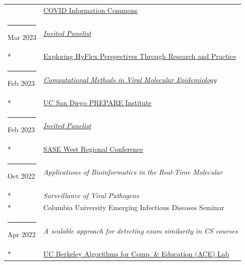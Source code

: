 \documentclass[margin,line]{res}
\begin{document}
\begin{resume}
\begin{longtable}{@{}p{0.7in}p{4in}}
\hspace*{-4mm} & \hspace{4mm} \href{https://covidinfocommons.datascience.columbia.edu/}{COVID Information Commons}\\
\hspace*{-4mm} \rule{-1mm}{5mm} Mar 2023 & \href{https://teaching.ucr.edu/deck/2023/03/09/exploring-hyflex-perspectives-through-research-and-practice-panel-discussion}{\textit{Invited Panelist}}\\*
\hspace*{-4mm} & \hspace{4mm} \href{https://teaching.ucr.edu/deck/2023/03/09/exploring-hyflex-perspectives-through-research-and-practice-panel-discussion}{Exploring HyFlex Perspectives Through Research and Practice}\\
\hspace*{-4mm} \rule{-1mm}{5mm} Feb 2023 & \href{https://youtu.be/IkSkQPXsXds}{\textit{Computational Methods in Viral Molecular Epidemiology}}\\*
\hspace*{-4mm} & \hspace{4mm} \href{https://prepare.ucsd.edu/}{UC San Diego PREPARE Institute}\\
\hspace*{-4mm} \rule{-1mm}{5mm} Feb 2023 & \href{https://www.saseconnect.org/regional-conferences}{\textit{Invited Panelist}}\\*
\hspace*{-4mm} & \hspace{4mm} \href{https://www.saseconnect.org/regional-conferences}{SASE West Regional Conference}\\
\hspace*{-4mm} \rule{-1mm}{5mm} Oct 2022 & \textit{Applications of Bioinformatics in the Real-Time Molecular}\\*
\hspace*{-4mm} & \hspace{4mm} \textit{Surveillance of Viral Pathogens}\\*
\hspace*{-4mm} & \hspace{4mm} Columbia University Emerging Infectious Diseases Seminar\\
\hspace*{-4mm} \rule{-1mm}{5mm} Apr 2022 & \textit{A scalable approach for detecting exam similarity in CS courses}\\*
\hspace*{-4mm} & \hspace{4mm} \href{https://acelab.berkeley.edu/}{UC Berkeley Algorithms for Comp. \& Education (ACE) Lab}\\

\end{longtable}
\end{resume}
\end{document}

